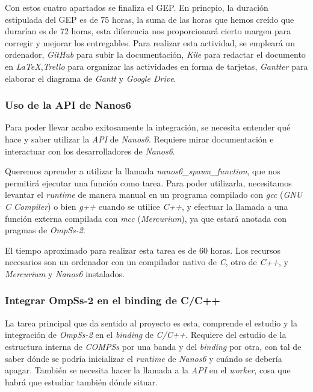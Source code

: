 Con estos cuatro apartados se finaliza el GEP. En princpio, la duración estipulada del GEP es de 75 horas, la suma de las horas que hemos creído que durarían es de 72 horas, esta diferencia nos proporcionará cierto margen para corregir y mejorar los entregables. Para realizar esta actividad, se empleará un ordenador, \textit{GitHub} para subir la documentación, \textit{Kile} para redactar el documento en \textit{LaTeX},\textit{Trello} para organizar las actividades en forma de tarjetas, \textit{Gantter} para elaborar el diagrama de \textit{Gantt} y \textit{Google Drive}.

\subsubsection{Uso de la API de Nanos6}

Para poder llevar acabo exitosamente la integración, se necesita entender qué hace y saber utilizar la \textit{API} de \textit{Nanos6}. Requiere mirar documentación e interactuar con los desarrolladores de \textit{Nanos6}. 
\par\bigskip

Queremos aprender a utilizar la llamada \textit{nanos6\_spawn\_function}, que nos permitirá ejecutar una función como tarea. Para poder utilizarla, necesitamos levantar el \textit{runtime} de manera manual en un programa compilado con \textit{gcc} (\textit{GNU C Compiler}) o bien \textit{g++} cuando se utilice \textit{C++}, y efectuar la llamada a una función externa compilada con \textit{mcc} (\textit{Mercurium}), ya que estará anotada con pragmas de \textit{OmpSs-2}.
\par\bigskip

El tiempo aproximado para realizar esta tarea es de 60 horas. Los recursos necesarios son un ordenador con un compilador nativo de \textit{C}, otro de \textit{C++}, y \textit{Mercurium} y \textit{Nanos6} instalados. 

\subsubsection{Integrar OmpSs-2 en el binding de C/C++}

La tarea principal que da sentido al proyecto es esta, comprende el estudio y la integración de \textit{OmpSs-2} en el \textit{binding} de \textit{C/C++}. Requiere del estudio de la estructura interna de \textit{COMPSs} por una banda y del \textit{binding} por otra, con tal de saber dónde se podría inicializar el \textit{runtime} de \textit{Nanos6} y cuándo se debería apagar. También se necesita hacer la llamada a la \textit{API} en el \textit{worker}, cosa que habrá que estudiar también dónde situar.
\par\bigskip

